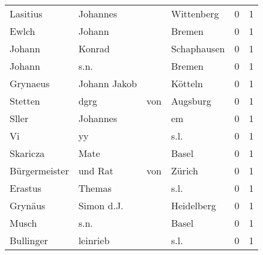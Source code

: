 \documentclass[10pt,a4paper,landscape]{article}
\begin{document}
\begin{longtable}{llllrr}
                 Lasitius &                           Johannes &             &                                  Wittenberg &          0 &         1 \\
                    Ewlch &                             Johann &             &                                      Bremen &          0 &         1 \\
                   Johann &                             Konrad &             &                                 Schaphausen &          0 &         1 \\
                   Johann &                               s.n. &             &                                      Bremen &          0 &         1 \\
                 Grynaeus &                       Johann Jakob &             &                                     Kötteln &          0 &         1 \\
                  Stetten &                               dgrg &         von &                                    Augsburg &          0 &         1 \\
                    Sller &                           Johannes &             &                                          em &          0 &         1 \\
                       Vi &                                 yy &             &                                        s.l. &          0 &         1 \\
                 Skaricza &                               Mate &             &                                       Basel &          0 &         1 \\
            Bürgermeister &                            und Rat &         von &                                      Zürich &          0 &         1 \\
                  Erastus &                             Themas &             &                                        s.l. &          0 &         1 \\
                  Grynäus &                         Simon d.J. &             &                                  Heidelberg &          0 &         1 \\
                    Musch &                               s.n. &             &                                       Basel &          0 &         1 \\
                Bullinger &                           leinrieb &             &                                        s.l. &          0 &         1 \\

\end{longtable}
\end{document}
